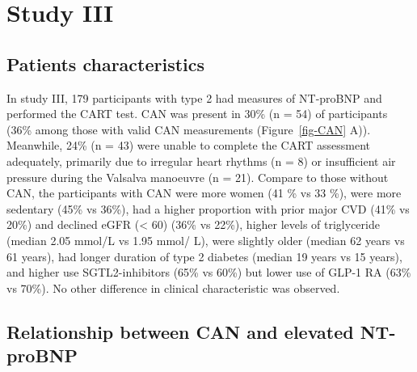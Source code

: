\documentclass[
  a4paper,
  headsepline=true,
  open=any]{scrbook}
\begin{document}
\hypertarget{study-iii-1}{%
\section{Study III}\label{study-iii-1}}

\hypertarget{patients-characteristics}{%
\subsection{Patients characteristics}\label{patients-characteristics}}

In study III, 179 participants with type 2 had measures of NT-proBNP and
performed the CART test. CAN was present in 30\% (n = 54) of
participants (36\% among those with valid CAN measurements
(Figure~\ref{fig-CAN} A)). Meanwhile, 24\% (n = 43) were unable to
complete the CART assessment adequately, primarily due to irregular
heart rhythms (n = 8) or insufficient air pressure during the Valsalva
manoeuvre (n = 21). Compare to those without CAN, the participants with
CAN were more women (41 \% vs 33 \%), were more sedentary (45\% vs
36\%), had a higher proportion with prior major CVD (41\% vs 20\%) and
declined eGFR (\textless{} 60) (36\% vs 22\%), higher levels of
triglyceride (median 2.05 mmol/L vs 1.95 mmol/ L), were slightly older
(median 62 years vs 61 years), had longer duration of type 2 diabetes
(median 19 years vs 15 years), and higher use SGTL2-inhibitors (65\% vs
60\%) but lower use of GLP-1 RA (63\% vs 70\%). No other difference in
clinical characteristic was observed.

\hypertarget{relationship-between-can-and-elevated-nt-probnp}{%
\subsection{Relationship between CAN and elevated
NT-proBNP}\label{relationship-between-can-and-elevated-nt-probnp}}
\end{document}
